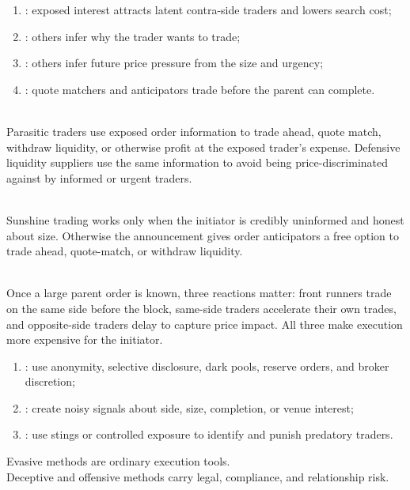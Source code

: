 \begin{taxonomy} 
\begin{enumerate}[label=\roman*.]
\setlength{\itemsep}{0pt}
\item {}: exposed interest attracts latent contra-side traders and lowers search cost;
\item {}: others infer why the trader wants to trade;
\item {}: others infer future price pressure from the size and urgency;
\item {}: quote matchers and anticipators trade before the parent can complete.
\end{enumerate}
\end{taxonomy}

\begin{definition} \\
Parasitic traders use exposed order information to trade ahead, quote match, withdraw liquidity, or otherwise profit at the exposed trader's expense. Defensive liquidity suppliers use the same information to avoid being price-discriminated against by informed or urgent traders.
\end{definition}

\begin{caveat} \\
Sunshine trading works only when the initiator is credibly uninformed and honest about size. Otherwise the announcement gives order anticipators a free option to trade ahead, quote-match, or withdraw liquidity.
\end{caveat}

\begin{mechanism} \\
Once a large parent order is known, three reactions matter: front runners trade on the same side before the block, same-side traders accelerate their own trades, and opposite-side traders delay to capture price impact. All three make execution more expensive for the initiator.
\end{mechanism}

\begin{taxonomy} 
\begin{enumerate}[label=\roman*.]
\setlength{\itemsep}{0pt}
\item {}: use anonymity, selective disclosure, dark pools, reserve orders, and broker discretion;
\item {}: create noisy signals about side, size, completion, or venue interest;
\item {}: use stings or controlled exposure to identify and punish predatory traders.
\end{enumerate}
Evasive methods are ordinary execution tools.\\
Deceptive and offensive methods carry legal, compliance, and relationship risk.
\end{taxonomy}


